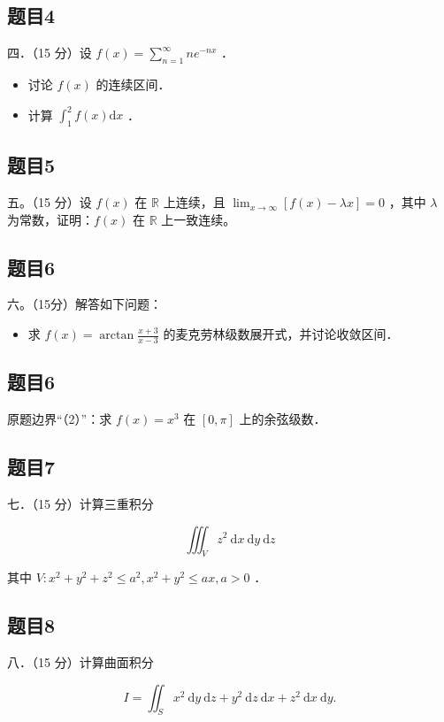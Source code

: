 \documentclass{article}
\begin{document}
\subsection{题目4}
四．（15 分）设 \(f(x)=\sum_{n=1}^{\infty} n e^{-n x}\) ．

\begin{itemize}
  \item[（1）] 讨论 \(f(x)\) 的连续区间．
  \item[（2）] 计算 \(\int_{1}^{2} f(x) \mathrm{d} x\) ．
\end{itemize}

\subsection{题目5}
五。（15 分）设 \(f(x)\) 在 \(\mathbb{R}\) 上连续，且 \(\lim _{x \rightarrow \infty}[f(x)-\lambda x]=0\) ，其中 \(\lambda\) 为常数，证明：\(f(x)\) 在 \(\mathbb{R}\) 上一致连续。

\subsection{题目6}
六。（15分）解答如下问题：

\begin{itemize}
  \item[（1）] 求 \(f(x)=\arctan \frac{x+3}{x-3}\) 的麦克劳林级数展开式，并讨论收敛区间．
\end{itemize}

\subsection{题目6}
原题边界“（2）”：求 \(f(x)=x^{3}\) 在 \([0, \pi]\) 上的余弦级数．

\subsection{题目7}
七．（15 分）计算三重积分

\[
\iiint_{V} z^{2} \mathrm{~d} x \mathrm{~d} y \mathrm{~d} z
\]

其中 \(V: x^{2}+y^{2}+z^{2} \leq a^{2}, x^{2}+y^{2} \leq a x, a>0\) ．

\subsection{题目8}
八．（15 分）计算曲面积分

\[
I=\iint_{S} x^{2} \mathrm{~d} y \mathrm{~d} z+y^{2} \mathrm{~d} z \mathrm{~d} x+z^{2} \mathrm{~d} x \mathrm{~d} y .
\]
\end{document}
